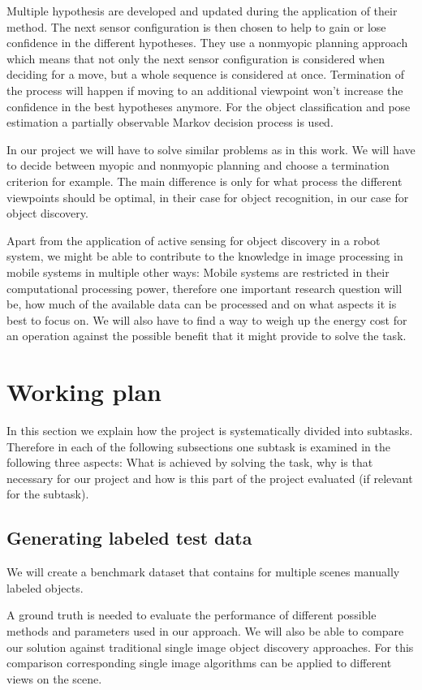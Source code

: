 \documentclass[a4paper,11pt,english]{article}
\begin{document}
Multiple hypothesis are developed and updated during the application of their method. The next sensor configuration is then chosen to help to gain or lose confidence in the different hypotheses.
They use a nonmyopic planning approach which means that not only the next sensor configuration is considered when deciding for a move, but a whole sequence is considered at once. 
Termination of the process will happen if moving to an additional viewpoint won't increase the confidence in the best hypotheses anymore.
For the object classification and pose estimation a partially observable Markov decision process is used.

In our project we will have to solve similar problems as in this work.
We will have to decide between myopic and nonmyopic planning and choose a termination criterion for example. The main difference is only for what process the different viewpoints should be optimal, in their case for object recognition, in our case for object discovery.\medskip

Apart from the application of active sensing for object discovery in a robot system, we might be able to contribute to the knowledge in image processing in mobile systems in multiple other ways:
Mobile systems are restricted in their computational processing power, therefore one important research question will be, how much of the available data can be processed and on what aspects it is best to focus on. 
We will also have to find a way to weigh up the energy cost for an operation against the possible benefit that it might provide to solve the task.

\section{Working plan}
In this section we explain how the project is systematically divided into subtasks.
Therefore in each of the following subsections one subtask is examined in the following three aspects: What is achieved by solving the task, why is that necessary for our project and how is this part of the project evaluated (if relevant for the subtask).

\subsection{Generating labeled test data}
We will create a benchmark dataset that contains for multiple scenes manually labeled objects.

A ground truth is needed to evaluate the performance of different possible methods and parameters used in our approach. We will also be able to compare our solution against traditional single image object discovery approaches. For this comparison corresponding single image algorithms can be applied to different views on the scene.
\end{document}
